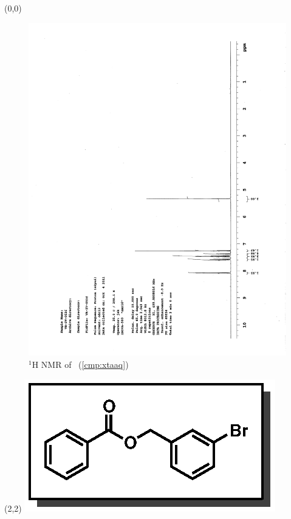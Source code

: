 \begin{textblock}{20}(0,0)
\begin{figure}[htb]
\caption{$^1$H NMR of \CMPxtaaq\ (\ref{cmp:xtaaq})}
\includegraphics[scale=0.75, trim = 0mm 0mm 0mm 5mm,
clip]{chp_asymmetric/images/nmr/xtaaqH}
\vspace{-100pt}
\end{figure}
\end{textblock}
\begin{textblock}{1}(2,2)
\includegraphics[scale=0.8, angle=90]{chp_asymmetric/images/xtaaq}
\end{textblock}
